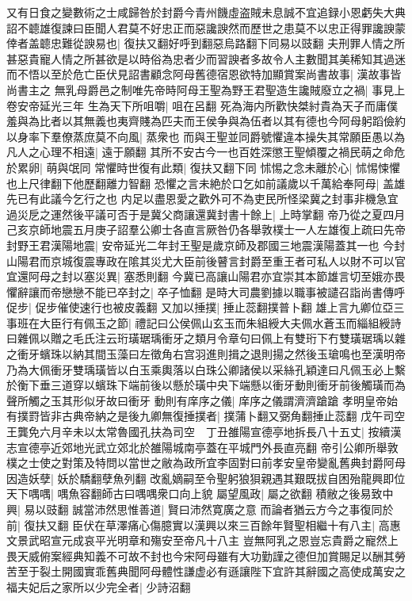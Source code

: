 又有日食之變數術之士咸歸咎於封爵今青州饑虛盗賊未息誠不宜追録小恩虧失大典詔不聼雄復諫曰臣聞人君莫不好忠正而惡讒諛然而歷世之患莫不以忠正得罪讒諛蒙倖者盖聼忠難從諛易也|{
	復扶又翻好呼到翻惡烏路翻下同易以豉翻}
夫刑罪人情之所甚惡貴寵人情之所甚欲是以時俗為忠者少而習諛者多故令人主數聞其美稀知其過迷而不悟以至於危亡臣伏見詔書顧念阿母舊德宿恩欲特加顯賞案尚書故事|{
	漢故事皆尚書主之}
無乳母爵邑之制唯先帝時阿母王聖為野王君聖造生讒賊廢立之禍|{
	事見上卷安帝延光三年}
生為天下所咀嚼|{
	咀在呂翻}
死為海内所歡快桀紂貴為天子而庸僕羞與為比者以其無義也夷齊賤為匹夫而王侯争與為伍者以其有德也今阿母躬蹈儉約以身率下羣僚蒸庶莫不向風|{
	蒸衆也}
而與王聖並同爵號懼違本操失其常願臣愚以為凡人之心理不相遠|{
	遠于願翻}
其所不安古今一也百姓深懲王聖傾覆之禍民萌之命危於累卵|{
	萌與氓同}
常懼時世復有此類|{
	復扶又翻下同}
怵惕之念未離於心|{
	怵惕悚懼也上尺律翻下他歷翻離力智翻}
恐懼之言未絶於口乞如前議歲以千萬給奉阿母|{
	盖雄先已有此議今乞行之也}
内足以盡恩愛之歡外可不為吏民所怪梁冀之封事非機急宜過災戹之運然後平議可否于是冀父商讓還冀封書十餘上|{
	上時掌翻}
帝乃從之夏四月己亥京師地震五月庚子詔羣公卿士各直言厥咎仍各舉敦樸士一人左雄復上疏曰先帝封野王君漢陽地震|{
	安帝延光二年封王聖是歲京師及郡國三地震漢陽蓋其一也}
今封山陽君而京城復震專政在隂其災尤大臣前後瞽言封爵至重王者可私人以財不可以官宜還阿母之封以塞災異|{
	塞悉則翻}
今冀已高讓山陽君亦宜崇其本節雄言切至娥亦畏懼辭讓而帝戀戀不能已卒封之|{
	卒子恤翻}
是時大司農劉據以職事被譴召詣尚書傳呼促步|{
	促步催使速行也被皮義翻}
又加以捶撲|{
	捶止蕊翻撲普卜翻}
雄上言九卿位亞三事班在大臣行有佩玉之節|{
	禮記曰公侯佩山玄玉而朱組綬大夫佩水蒼玉而緇組綬詩曰雜佩以贈之毛氏注云珩璜琚瑀衝牙之類月令章句曰佩上有雙珩下冇雙璜琚瑀以雜之衝牙蠙珠以納其間玉藻曰左徵角右宫羽進則揖之退則揚之然後玉瑲鳴也至漢明帝乃為大佩衝牙雙瑀璜皆以白玉乘輿落以白珠公卿諸侯以采絲孔穎達曰凡佩玉必上繫於衡下垂三道穿以蠙珠下端前後以懸於璜中央下端懸以衝牙動則衝牙前後觸璜而為聲所觸之玉其形似牙故曰衝牙}
動則有庠序之儀|{
	庠序之儀謂濟濟蹌蹌}
孝明皇帝始有撲罸皆非古典帝納之是後九卿無復捶撲者|{
	撲蒲卜翻又弼角翻捶止蕊翻}
戊午司空王龔免六月辛未以太常魯國孔扶為司空　丁丑雒陽宣德亭地拆長八十五丈|{
	按續漢志宣德亭近郊地光武立郊北於雒陽城南亭蓋在平城門外長直亮翻}
帝引公卿所舉敦樸之士使之對策及特問以當世之敝為政所宜李固對曰前孝安皇帝變亂舊典封爵阿母因造妖孽|{
	妖於驕翻孽魚列翻}
改亂嫡嗣至令聖躬狼狽親遇其艱既拔自困殆龍興即位天下喁喁|{
	喁魚容翻師古曰喁喁衆口向上貌}
屬望風政|{
	屬之欲翻}
積敝之後易致中興|{
	易以豉翻}
誠當沛然思惟善道|{
	賢曰沛然寛廣之意}
而論者猶云方今之事復同於前|{
	復扶又翻}
臣伏在草澤痛心傷臆實以漢興以來三百餘年賢聖相繼十有八主|{
	高惠文景武昭宣元成哀平光明章和殤安至帝凡十八主}
豈無阿乳之恩豈忘貴爵之寵然上畏天威俯案經典知義不可故不封也今宋阿母雖有大功勤謹之德但加賞賜足以酬其勞苦至于裂土開國實乖舊典聞阿母體性謙虚必有遜讓陛下宜許其辭國之高使成萬安之福夫妃后之家所以少完全者|{
	少詩沼翻}
